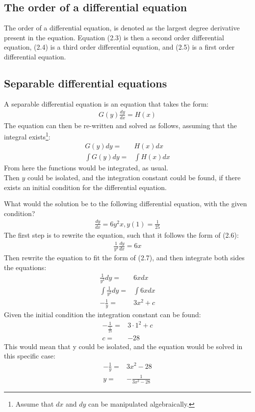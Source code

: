 \subsection{The order of a differential equation}
The order of a differential equation, is denoted as the largest degree derivative present in the equation. Equation (2.3) is then a second order differential equation, (2.4) is a third order differential equation, and (2.5) is a first order differential equation.

\subsection{Separable differential equations} \label{SDE}
A separable differential equation is an equation that takes the form:
\begin{align}
	G(y)\frac{dy}{dx}=H(x)
\end{align}
The equation can then be re-written and solved as follows, assuming that the integral exists\footnote{Assume that $dx$ and $dy$ can be manipulated algebraically. }:
\begin{align}
	G(y)dy=&H(x)dx				\\
	\int G(y)dy =& \int H(x)dx
\end{align}
From here the functions would be integrated, as usual.\\
Then $y$ could be isolated, and the integration constant could be found, if there exists an initial condition for the differential equation.
\begin{tcolorbox}[colback=red!5!white,colframe=red!75!black,title=Example] 
What would the solution be to the following differential equation, with the given condition?
\begin{align*}
	\frac{dy}{dx} = 6y^2x, y(1)=\frac{1}{25}
\end{align*}
The first step is to rewrite the equation, such that it follows the form of (2.6):
\begin{align*}
	\frac{1}{y^2}\frac{dy}{dx}=6x
\end{align*}
Then rewrite the equation to fit the form of (2.7), and then integrate both sides the equations:
\begin{align*}
	\frac{1}{y^2}dy=&6x dx				\\
	\int \frac{1}{y^2}dy=&\int 6x dx		\\
	-\frac{1}{y}=&3x^2+c		
\end{align*}
Given the initial condition the integration constant can be found:
\begin{align*}
	-\frac{1}{\frac{1}{25}}=&3\cdot 1^2+c	\\
	c=&-28
\end{align*}
This would mean that y could be isolated, and the equation would be solved in this specific case:
\begin{align*}
	-\frac{1}{y}=&3x^2-28\\
	y=&-\frac{1}{3x^2-28}
\end{align*}
\end{tcolorbox}